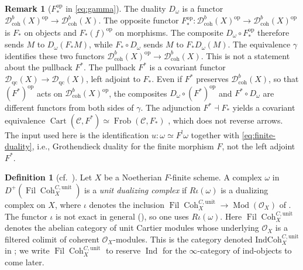 \documentclass[11pt]{amsart}
\newcommand{\cO}{\mathcal{O}}
\newcommand{\cC}{\mathcal{C}}
\newcommand{\Cart}{\operatorname{Cart}}
\newcommand{\op}{{\operatorname{op}}}
\newcommand{\Coh}{\operatorname{{Coh}}}
\newcommand{\Fil}{{\operatorname{Fil}}}
\newcommand{\Ind}{\operatorname{Ind}}
\newcommand{\Frob}{\operatorname{Frob}}
\newcommand{\Dqc}{\mathcal D_{\mathrm{qc}}}
\newcommand{\Dbc}{\mathcal D^b_{\mathrm{coh}}}
\theoremstyle{plain}
\theoremstyle{definition}
\newtheorem{definition}[definition]{Definition}
\newtheorem{remark}[remark]{Remark}
\numberwithin{equation}{section}
\begin{document}
\begin{remark}[$F_*^{\op}$ in \eqref{eq:gamma}]\label{rem:Fop-gamma}
The duality $D_\omega$ is a functor $\Dbc(X)^{\op}\to\Dbc(X)$.
The opposite functor $F_*^{\op}:\Dbc(X)^{\op}\to\Dbc(X)^{\op}$ is $F_*$ on objects and $F_*(f)^{\op}$ on morphisms.
The composite $D_\omega\circ F_*^{\op}$ therefore sends $M$ to $D_\omega(F_*M)$, while $F_*\circ D_\omega$ sends $M$ to $F_*D_\omega(M)$.
The equivalence $\gamma$ identifies these two functors $\Dbc(X)^{\op}\to\Dbc(X)$.
This is not a statement about the pullback $F^*$.
The pullback $F^*$ is a covariant functor $\Dqc(X)\to\Dqc(X)$, left adjoint to $F_*$.
Even if $F^*$ preserves $\Dbc(X)$, so that $(F^*)^{\op}$ acts on $\Dbc(X)^{\op}$, the composites $D_\omega\circ (F^*)^{\op}$ and $F^*\circ D_\omega$ are different functors from both sides of $\gamma$.
The adjunction $F^*\dashv F_*$ yields a covariant equivalence $\Cart(\cC,F^*)\simeq\Frob(\cC,F_*)$ \cite[Proposition 2.9; Corollary 2.10]{MWC}, which does not reverse arrows.
The input used here is the identification $u:\omega\simeq F^!\omega$ together with \eqref{eq:finite-duality}, i.e., Grothendieck duality for the finite morphism $F$, not the left adjoint $F^*$.
\end{remark}

\begin{definition}[{cf.\ \cite[Definition 4.2.1]{Bau}}]\label{def:unit-dualizing}
Let $X$ be a Noetherian $F$-finite scheme.
A complex $\omega$ in $D^+(\Fil\Coh^{C,\mathrm{unit}}_X)$ is a \emph{unit dualizing complex} if $R\iota(\omega)$ is a dualizing complex on $X$, where $\iota$ denotes the inclusion $\Fil\Coh^{C,\mathrm{unit}}_X\to\operatorname{Mod}(\cO_X)$ of \cite[Definition 4.2.1]{Bau}.
The functor $\iota$ is not exact in general (), so one uses $R\iota(\omega)$.
Here $\Fil\Coh^{C,\mathrm{unit}}_X$ denotes the abelian category of unit Cartier modules whose underlying $\cO_X$ is a filtered colimit of coherent $\cO_X$-modules.
This is the category denoted $\mathrm{IndCoh}^{C,\mathrm{unit}}_X$ in \cite[Definition 3.4.5]{Bau}; we write $\Fil\Coh^{C,\mathrm{unit}}_X$ to reserve $\Ind$ for the $\infty$-category of ind-objects to come later.
\end{definition}
\end{document}
